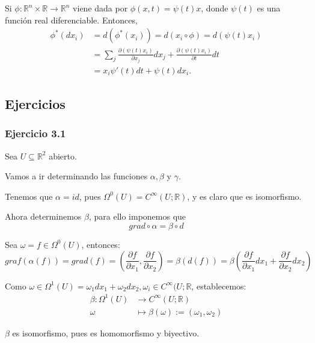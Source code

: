 Si $\phi: \mathbb{R}^n\times \mathbb{R} \rightarrow \mathbb{R}^n$ viene dada por $\phi(x,t)=\psi(t) x$, donde $\psi(t)$ es una función real diferenciable. Entonces,
\begin{equation}
  \begin{split}
    \phi^*(dx_i)&=d(\phi^*(x_i))=d(x_i\circ \phi)=d(\psi(t)x_i)\\
    &=\sum_j \frac{\partial (\psi(t)x_i)}{\partial x_j}dx_j+\frac{\partial(\psi(t)x_i)}{\partial t}dt \\
    &=x_i\psi'(t)dt+\psi(t)dx_i.
  \end{split}
\end{equation}

\newpage
\subsection{Ejercicios}

\subsubsection{Ejercicio 3.1}

Sea $U\subseteq \mathbb{R}^2$ abierto.

\vspace{30mm}

Vamos a ir determinando las funciones $\alpha,\beta $ y $\gamma $.

Tenemos que $\alpha = id$, pues $\Omega^0(U)=C^\infty(U;\mathbb{R})$, y es claro que es isomorfismo.

Ahora determinemos $\beta $, para ello imponemos que
$$ grad \circ \alpha = \beta \circ d$$

Sea $\omega = f\in \Omega^0(U)$, entonces:
$$graf(\alpha(f))=grad (f) = (\frac{\partial f }{\partial x_1},\frac{\partial f}{\partial x_2})= \beta(d(f))=\beta (\frac{\partial f }{\partial x_1}dx_1+\frac{\partial f}{\partial x_2}dx_2) $$

Como $\omega\in \Omega^1(U)=\omega_1dx_1+\omega_2dx_2, \omega_i\in C^\infty(U;\mathbb{R}$, establecemos:
\begin{equation}
  \begin{split}
    \beta : \Omega^1(U)&\rightarrow C^\infty(U;\mathbb{R}) \\
    \omega &\mapsto\beta(\omega):=(\omega_1,\omega_2)
  \end{split}
\end{equation}

$\beta $ es isomorfismo, pues es homomorfismo y biyectivo.

